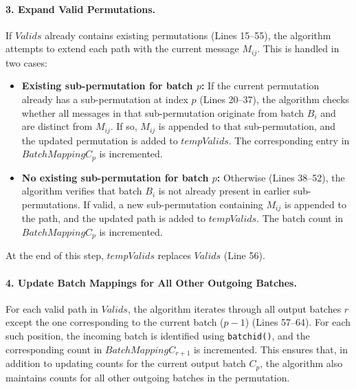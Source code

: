 \documentclass{article}
\begin{document}
\paragraph{3. Expand Valid Permutations.}
If $Valids$ already contains existing permutations (Lines 15–55), the algorithm attempts to extend each path with the current message $M_{ij}$.  
This is handled in two cases:  
\begin{itemize}
    \item \textbf{Existing sub-permutation for batch $p$:} If the current permutation already has a sub-permutation at index $p$ (Lines 20–37), the algorithm checks whether all messages in that sub-permutation originate from batch $B_i$ and are distinct from $M_{ij}$. If so, $M_{ij}$ is appended to that sub-permutation, and the updated permutation is added to $tempValids$. The corresponding entry in $BatchMappingC_p$ is incremented.
    \item \textbf{No existing sub-permutation for batch $p$:} Otherwise (Lines 38–52), the algorithm verifies that batch $B_i$ is not already present in earlier sub-permutations. If valid, a new sub-permutation containing $M_{ij}$ is appended to the path, and the updated path is added to $tempValids$. The batch count in $BatchMappingC_p$ is incremented.
\end{itemize}
At the end of this step, $tempValids$ replaces $Valids$ (Line 56).


\paragraph{4. Update Batch Mappings for All Other Outgoing Batches.}
For each valid path in $Valids$, the algorithm iterates through all output batches $r$ except the one corresponding to the current batch ($p-1$) (Lines 57–64).  
For each such position, the incoming batch is identified using \texttt{batchid()}, and the corresponding count in $BatchMappingC_{r+1}$ is incremented.  
This ensures that, in addition to updating counts for the current output batch $C_p$, the algorithm also maintains counts for all other outgoing batches in the permutation.
\end{document}
